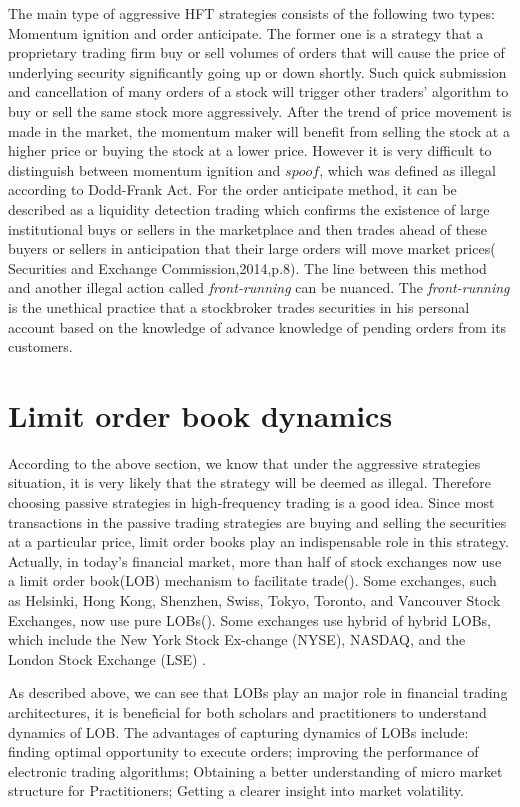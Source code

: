 The main type of aggressive HFT strategies consists of the following two types:
Momentum ignition and order anticipate. The former one is a strategy that a proprietary trading firm buy or sell volumes of orders that will cause the price of underlying security significantly going up or down shortly. Such quick submission and cancellation of many orders of a stock will trigger other traders' algorithm to buy or sell the same stock more aggressively. After the trend of price movement is made in the market, the momentum maker will benefit from selling the stock at a higher price or buying the stock at a lower price. However it is very difficult to distinguish between momentum ignition and $\textit{spoof}$, which was defined as illegal according to Dodd-Frank Act.  For the order anticipate method, it can be described as a liquidity detection trading which confirms the existence of large institutional buys or sellers in the marketplace and then trades ahead of these buyers or sellers in anticipation that their large orders will move market prices( Securities and Exchange Commission,2014,p.8). The line between this method and another illegal action called \textit{front-running} can be nuanced. The \textit{front-running} is the unethical practice that a stockbroker trades securities in his personal account based on the knowledge of advance knowledge of pending orders from its customers. 

\section{Limit order book dynamics}
According to the above section, we know that under the aggressive strategies situation, it is very likely that the strategy will be deemed as illegal. Therefore choosing passive strategies in high-frequency trading is a good idea. Since most transactions in the passive trading strategies are buying and selling the securities at a particular price, limit order books play an indispensable role in this strategy.  
Actually, in today's financial market, more than half of stock exchanges now use a limit order book(LOB) mechanism to facilitate trade(\cite{rosu2009dynamic}).  Some exchanges, such as Helsinki, Hong Kong, Shenzhen, Swiss, Tokyo, Toronto, and
Vancouver Stock Exchanges, now use pure LOBs(\cite{luckock2001statistical}). Some exchanges use hybrid of hybrid LOBs, which include  the New York Stock Ex-change (NYSE), NASDAQ, and the London Stock Exchange
(LSE) \citep{cont2010stochastic}. 

As described above, we can see that LOBs play an major role in financial trading architectures, it is beneficial for both scholars and practitioners to understand dynamics of LOB. The advantages of capturing dynamics of LOBs include: finding optimal opportunity to execute orders\citep{obizhaeva2013optimal}; improving the performance of electronic trading algorithms\citep{engle2006measuring}; Obtaining a better understanding of micro market structure for Practitioners\citep{harris2003trading}; Getting a clearer insight into market volatility\citep{kirilenko2015flash}.

